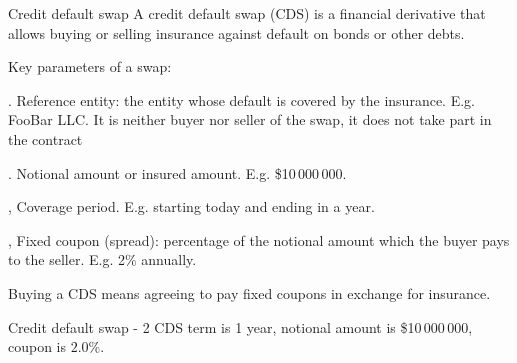 \documentclass{beamer}
\begin{document}
\begin{frame}{Credit default swap}
\justify
A \alert{credit default swap (CDS)} is a financial derivative that allows buying or selling insurance against default on bonds or other debts.

\justify
Key parameters of a swap:

. Reference entity: the entity whose default is covered by the insurance. E.g. FooBar LLC. It is neither buyer nor seller of the swap, it does not take part in the contract

. Notional amount or insured amount. E.g. \$10\,000\,000.

, Coverage period. E.g. starting today and ending in a year.

, Fixed coupon (spread): percentage of the notional amount which the buyer pays to the seller. E.g. 2\% annually.

\justify
Buying a CDS means agreeing to pay fixed coupons in exchange for insurance. 
\end{frame}



\newcommand{\swapPartyNode}[5]{

	\draw (#1, #2)
		node[
			rectangle,
			draw,
			rounded corners,
			anchor = south,
			minimum height = 0.8cm,
			minimum width = 2.5cm
		]
		{#5}
	--
	(#3, #4);
}

\newcommand{\swapBuyerPaymentEx}[7]{

	\draw [
		->,
		>=triangle 90
	] 
	(#1, #2)
	node[
		label = left:{#7}
	]{}
	-- (#3, #4)
	node[
		pos=0.5,
		anchor=south
	]
	{#5}
	node[
		pos=0.5,
		anchor=north
	]
	{#6};
}

\newcommand{\swapBuyerPayment}[6]{

	\swapBuyerPaymentEx{#1}{#2}{#3}{#4}{#5}{}{#6}
}

\begin{frame}{Credit default swap - 2}
\justify
CDS term is 1 year, notional amount is \$10\,000\,000, coupon is $2.0\%$.

\justify
\centering
{}
\end{frame}
\end{document}
